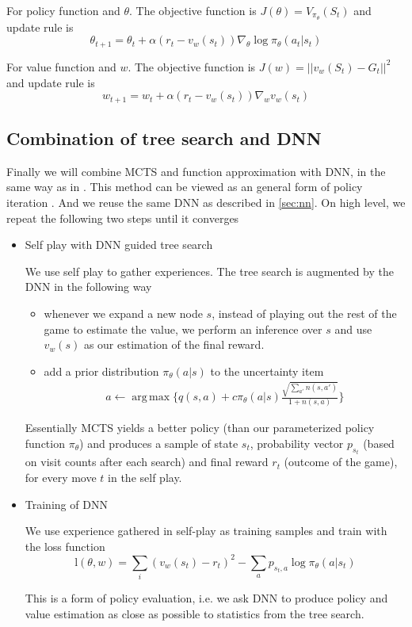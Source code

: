 \documentclass{article}
\DeclareMathOperator*{\argmax}{arg\,max}
\begin{document}
For policy function and $\theta$. The objective function is  $J(\theta) = V_{\pi_{\theta}}(S_t)$ and update rule is
$$ \theta_{t+1} = \theta_{t} + \alpha 
( r_t  - v_w(s_t))
\nabla_{\theta} \log \pi_{\theta}(a_t|s_t) 
$$

For value function and $w$. The objective function is  $J(w) = ||v_w(S_t) - G_t||^2$ and update rule is 
$$ w_{t+1} = w_{t} + \alpha 
( r_t  - v_w(s_t))
\nabla_{w} v_w(s_t) 
$$
\subsection{Combination of tree search and DNN}
\label{sec:combined}
Finally we will combine MCTS and function approximation with DNN, in the same way as in \cite{silver2017masteringalphagozero}. This method can be viewed as an general form of policy iteration \cite{sutton2018reinforcement}. And we reuse the same DNN as described in \ref{sec:nn}. On high level, we repeat the following two steps until it converges

\begin{itemize}
  \item
    Self play with DNN guided tree search

    We use self play to gather experiences. The tree search is augmented by the DNN in the following way
    \begin{itemize}
   \item
    whenever we expand a new node $s$, instead of playing out the rest of the game to estimate the value, we perform an inference over $s$ and use $v_w(s)$ as our estimation of the final reward. 
  \item
    add a prior distribution $\pi_{\theta}(a|s)$ to the uncertainty item
\begin{align}
a  \gets 
\argmax 
\{ q(s, a) + c \pi_{\theta}(a|s) \frac{\sqrt{\sum_{a'}n(s, a')}}{1 + n(s,a)} \}
\label{equ:puct}
\end{align}
\end{itemize}
   
Essentially MCTS yields a better policy (than our parameterized policy function $\pi_{\theta}$) and produces a sample of state $s_t$, probability vector $p_{s_t}$ (based on visit counts after each search) and final reward $r_t$ (outcome of the game), for every move $t$ in the self play.  


  \item
    Training of DNN
    
    We use experience gathered in self-play as training samples and train with the loss function
    $$ \text{l}(\theta, w) = \sum_i (v_w(s_t) - r_t)^2 - \sum_a p_{s_t, a} \log \pi_{\theta}(a|s_t)  $$
    
    This is a form of policy evaluation, i.e. we ask DNN to produce policy and value estimation as close as possible to statistics from the tree search.  

\end{itemize}
\end{document}
